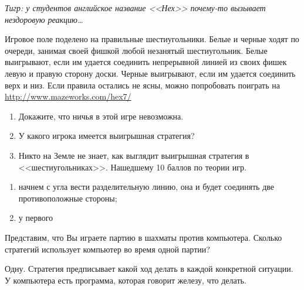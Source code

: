 \begin{problem}[<<Шестиугольники>>]\par

{\it Тигр: у студентов английское название <<Нех>> почему-то вызывает нездоровую реакцию\ldots }\par

Игровое поле поделено на правильные шестиугольники. Белые и черные ходят по очереди, занимая своей фишкой любой незанятый шестиугольник. Белые выигрывают, если им удается соединить непрерывной линией из своих фишек левую и правую сторону доски. Черные выигрывают, если им удается соединить верх и низ. Если правила остались не ясны, можно попробовать поиграть на \url{http://www.mazeworks.com/hex7/}\par

\begin{enumerate}
\item 	Докажите, что ничья в этой игре невозможна.\par
\item 	У какого игрока имеется выигрышная стратегия?\par
\item 	Никто на Земле не знает, как выглядит выигрышная стратегия в <<шестиугольниках>>. Нашедшему 10 баллов по теории игр.\par
\end{enumerate}



\begin{sol}
\begin{enumerate}
\item начнем с угла вести разделительную линию, она и будет соединять две противоположные стороны;
\item у первого
\end{enumerate}
\end{sol}
\end{problem}



\begin{problem}\par
Представим, что Вы играете партию в шахматы против компьютера. Сколько стратегий использует компьютер во время одной партии?

\begin{sol}
Одну. Стратегия предписывает какой ход делать в каждой конкретной ситуации. У компьютера есть программа, которая говорит железу, что делать.
\end{sol}
\end{problem}






